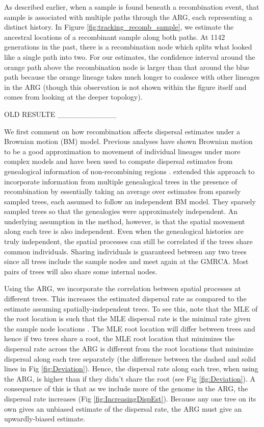 As described earlier, when a sample is found beneath a recombination event, that sample is associated with multiple paths through the ARG, each representing a distinct history. In Figure \ref{fig:tracking_recomb_sample}, we estimate the ancestral locations of a recombinant sample along both paths. At 1142 generations in the past, there is a recombination node which splits what looked like a single path into two. For our estimates, the confidence interval around the orange path above the recombination node is larger than that around the blue path because the orange lineage takes much longer to coalesce with other lineages in the ARG (though this observation is not shown within the figure itself and comes from looking at the deeper topology).


OLD RESULTE ___________

We first comment on how recombination affects dispersal estimates under a Brownian motion (BM) model. Previous analyses have shown Brownian motion to be a good approximation to movement of individual lineages under more complex models \citep{barton2010new} and have been used to compute dispersal estimates from genealogical information of non-recombining regions \citep{Lemey2009}. \cite{Osmond2021} extended this approach to incorporate information from multiple genealogical trees in the presence of recombination by essentially taking an average over estimates from sparsely sampled trees, each assumed to follow an independent BM model. They sparsely sampled trees so that the genealogies were approximately independent. An underlying assumption in the method, however, is that the spatial movement along each tree is also independent. Even when the genealogical histories are truly independent, the spatial processes can still be correlated if the trees share common individuals. Sharing individuals is guaranteed between any two trees since all trees include the sample nodes and meet again at the GMRCA. Most pairs of trees will also share some internal nodes.  


Using the ARG, we incorporate the correlation between spatial processes at different trees. This increases the estimated dispersal rate as compared to the estimate assuming  spatially-independent trees. To see this, note that the MLE of the root location is such that the MLE dispersal rate is the minimal rate given the sample node locations \citep{maddison1991squared}. The MLE root location will differ between trees and hence if two trees share a root, the MLE root location that minimizes the dispersal rate across the ARG is different from the root locations that minimize dispersal along each tree separately (the difference between the dashed and solid lines in Fig \ref{fig:Deviation}). Hence, the dispersal rate along each tree, when using the ARG, is higher than if they didn't share the root (see Fig \ref{fig:Deviation}). A consequence of this is that as we include more of the genome in the ARG, the dispersal rate increases (Fig \ref{fig:IncreasingDispEst}). Because any one tree on its own gives an unbiased estimate of the dispersal rate, the ARG must give an upwardly-biased estimate.

